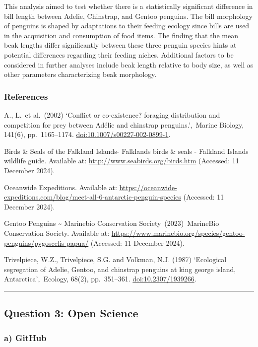 \documentclass[
]{article}
\begin{document}
This analysis aimed to test whether there is a statistically significant
difference in bill length between Adelie, Chinstrap, and Gentoo
penguins. The bill morphology of penguins is shaped by adaptations to
their feeding ecology since bills are used in the acquisition and
consumption of food items. The finding that the mean beak lengths differ
significantly between these three penguin species hints at potential
differences regarding their feeding niches. Additional factors to be
considered in further analyses include beak length relative to body
size, as well as other parameters characterizing beak morphology.

\subsubsection{References}\label{references}

A., L.~et al.~(2002) `Conflict or co-existence? foraging distribution
and competition for prey between Adélie and chinstrap penguins.',~Marine
Biology, 141(6), pp.~1165--1174. \url{doi:10.1007/s00227-002-0899-1}.~

Birds \& Seals of the Falkland Islands- Falklands birds \& seals -
Falkland Islands wildlife guide. Available at:
\url{http://www.seabirds.org/birds.htm} (Accessed: 11 December 2024).~

Oceanwide Expeditions. Available at:
\url{https://oceanwide-expeditions.com/blog/meet-all-6-antarctic-penguin-species}
(Accessed: 11 December 2024).~

Gentoo Penguins \textasciitilde{} Marinebio Conservation
Society~(2023)~MarineBio Conservation Society. Available at:
\url{https://www.marinebio.org/species/gentoo-penguins/pygoscelis-papua/}
(Accessed: 11 December 2024).~

Trivelpiece, W.Z., Trivelpiece, S.G. and Volkman, N.J. (1987)
`Ecological segregation of Adelie, Gentoo, and chinstrap penguins at
king george island, Antarctica',~Ecology, 68(2), pp.~351--361.
\url{doi:10.2307/1939266}.~

\begin{center}\rule{0.5\linewidth}{0.5pt}\end{center}

\subsection{Question 3: Open Science}\label{question-3-open-science}

\subsubsection{a) GitHub}\label{a-github}
\end{document}
